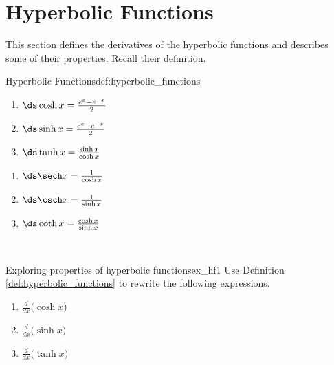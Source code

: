 \section{Hyperbolic Functions}\label{sec:hyperbolic}

This section defines the derivatives of the hyperbolic functions and describes some of their properties. Recall their definition.

\begin{definition}{Hyperbolic Functions}{def:hyperbolic_functions} 
{\noindent%
\begin{minipage}{.5\textwidth}
\begin{enumerate}
\item		$\ds \cosh x = \frac{e^x+e^{-x}}2$
\item		$\ds \sinh x = \frac{e^x-e^{-x}}2$
\item		$\ds \tanh x = \frac{\sinh x}{\cosh x}$
\end{enumerate}
\end{minipage}
\begin{minipage}{.5\textwidth}
\begin{enumerate}\addtocounter{enumi}{3}
\item		$\ds \sech x = \frac{1}{\cosh x}$
\item		$\ds \csch x = \frac{1}{\sinh x}$
\item		$\ds \coth x = \frac{\cosh x}{\sinh x}$
\end{enumerate}
\end{minipage}
}\\
\end{definition}

\begin{example}{Exploring properties of hyperbolic functions}{ex_hf1}
\noindent Use Definition \ref{def:hyperbolic_functions} to rewrite the following expressions.
\begin{enumerate}
\item		$\frac{d}{dx}\big(\cosh x\big)$
\item		$\frac{d}{dx}\big(\sinh x\big)$
\item		$\frac{d}{dx}\big(\tanh x\big)$
\end{enumerate}
\end{example}

